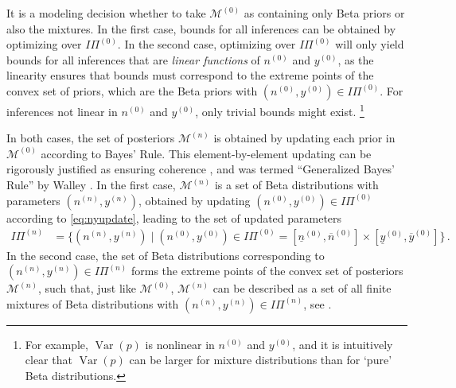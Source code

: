 \documentclass[runningheads,a4paper]{llncs}
\newcommand{\uz}{^{(0)}} %
\newcommand{\un}{^{(n)}} %
\newcommand{\ul}[1]{\underline{#1}}
\newcommand{\ol}[1]{\overline{#1}}
\def\yz{y\uz}
\def\yn{y\un}
\def\yzl{\ul{y}\uz}
\def\yzu{\ol{y}\uz}
\def\nz{n\uz}
\def\nn{n\un}
\def\nzl{\ul{n}\uz}
\def\nzu{\ol{n}\uz}
\def\PZ{I\!\!\Pi\uz}
\def\PN{I\!\!\Pi\un}
\def\MZ{\mathcal{M}\uz}
\def\MN{\mathcal{M}\un}
\newcommand{\V}{\operatorname{Var}}
\begin{document}
It is a modeling decision whether to take $\MZ$ as containing only Beta priors or also the mixtures.
In the first case, bounds for all inferences can be obtained by optimizing over $\PZ$.
In the second case, optimizing over $\PZ$ will only yield bounds for all inferences
that are \emph{linear functions} of $\nz$ and $\yz$,
as the linearity ensures that bounds must correspond to the extreme points of the convex set of priors,
which are the Beta priors with $(\nz, \yz) \in \PZ$.
For inferences not linear in $\nz$ and $\yz$, only trivial bounds might exist.%
\footnote{For example, $\V(p)$ is nonlinear in $\nz$ and $\yz$,
and it is intuitively clear that $\V(p)$ can be larger for mixture distributions than for `pure' Beta distributions.}

In both cases, the set of posteriors $\MN$ is obtained by updating each prior in $\MZ$ according to Bayes' Rule.
This element-by-element updating can be rigorously justified
as ensuring coherence \cite[\S 2.5]{1991:walley}, and was termed ``Generalized Bayes' Rule'' by Walley \cite[\S 6.4]{1991:walley}.
In the first case, $\MN$ is a set of Beta distributions with parameters $(\nn, \yn)$,
obtained by updating $(\nz, \yz) \in \PZ$ according to \eqref{eq:nyupdate},
leading to the set of updated parameters
\begin{align}
\PN &= \Big\{ (\nn, \yn) \mid (\nz, \yz) \in \PZ = [\nzl, \nzu] \times [\yzl, \yzu] \Big\}\,.
\label{eq:paramsets}
\end{align}
In the second case, the set of Beta distributions corresponding to $(\nn, \yn) \in \PN$
forms the extreme points of the convex set of posteriors $\MN$,
such that, just like $\MZ$, $\MN$ can be described as a set of all finite mixtures of Beta distributions
with $(\nn, \yn) \in \PN$, see \cite[pp.~56f]{2013:diss-gw}.
\end{document}
